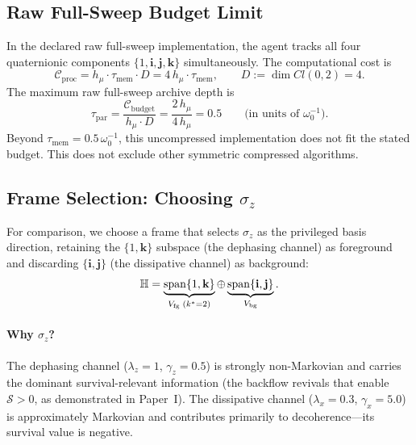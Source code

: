 \documentclass[12pt]{article}
\begin{document}
\subsection{Raw Full-Sweep Budget Limit}
\label{subsec:unbroken}

In the declared raw full-sweep implementation, the agent tracks all four
quaternionic components
$\{1, \mathbf{i}, \mathbf{j}, \mathbf{k}\}$
simultaneously.
The computational cost is
\begin{equation}
\label{eq:cost_full}
\mathcal{C}_{\mathrm{proc}}
= h_\mu \cdot \tau_{\mathrm{mem}} \cdot D
= 4\,h_\mu \cdot \tau_{\mathrm{mem}},
\qquad D := \dim Cl(0,2) = 4.
\end{equation}
The maximum raw full-sweep archive depth is
\begin{equation}
\label{eq:t_par_example}
\tau_{\mathrm{par}}
= \frac{\mathcal{C}_{\mathrm{budget}}}
       {h_\mu \cdot D}
= \frac{2\,h_\mu}{4\,h_\mu} = 0.5
\qquad\text{(in units of $\omega_0^{-1}$)}.
\end{equation}
Beyond $\tau_{\mathrm{mem}} = 0.5\,\omega_0^{-1}$,
this uncompressed implementation does not fit the stated budget.  This
does not exclude other symmetric compressed algorithms.

\subsection{Frame Selection: Choosing $\sigma_z$}
\label{subsec:choosing}

For comparison, we choose a frame that selects $\sigma_z$
as the privileged basis direction,
retaining the $\{1, \mathbf{k}\}$ subspace (the dephasing
channel) as foreground and discarding
$\{\mathbf{i}, \mathbf{j}\}$ (the dissipative channel)
as background:
\begin{equation}
\label{eq:decomp_example}
\mathbb{H}
= \underbrace{\mathrm{span}\{1, \mathbf{k}\}}_{%
  V_{\mathrm{fg}}\; (k^* = 2)}
\oplus
\underbrace{\mathrm{span}\{\mathbf{i}, \mathbf{j}\}}_{%
  V_{\mathrm{bg}}}.
\end{equation}

\paragraph{Why $\sigma_z$?}
The dephasing channel ($\lambda_z = 1$, $\gamma_z = 0.5$)
is strongly non-Markovian and carries the dominant
survival-relevant information (the backflow revivals that
enable $\mathcal{S} > 0$, as demonstrated in Paper~I).
The dissipative channel ($\lambda_x = 0.3$, $\gamma_x = 5.0$)
is approximately Markovian and contributes primarily to
decoherence---its survival value is negative.
\end{document}

